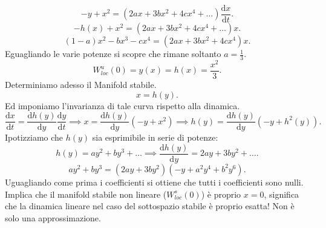 \begin{exmp}[]
    \[
	-y + x^2 = (2ax + 3bx^2+ 4cx^4 + \ldots)\frac{\text{d} x}{\text{d} t}
    .\] 
    \[
	-h(x) + x^2 = (2ax + 3bx^2+ 4cx^4 + \ldots)x
    .\] 
    \[
	(1-a)x^2 - bx^3 - cx^4 = (2ax + 3bx^2+ 4cx^4 )x
    .\] 
    Eguagliando le varie potenze si scopre che rimane soltanto $a = \frac{1}{3}$.
    \[
	W_{loc}^u(0)  = y(x) = h(x) = \frac{x^2}{3}
    .\] 
    Determiniamo adesso il Manifold stabile. 
    \[
	x = h(y) 
    .\] 
    Ed imponiamo l'invarianza di tale curva rispetto alla dinamica.
    \[
	\frac{\text{d} x}{\text{d} t} = \frac{\text{d} h(y) }{\text{d} y} \frac{\text{d} y}{\text{d} t} \implies 
	x = \frac{\text{d} h(y) }{\text{d} y} (-y+ x^2) \implies 
	h(y) = \frac{\text{d} h(y) }{\text{d} y} (-y+ h^2(y) )
    .\] 
    Ipotizziamo che $h(y) $ sia esprimibile in serie di potenze:
    \[
	h(y) = ay^2 + by^3+ \ldots \implies  \frac{\text{d} h(y) }{\text{d} y} = 2ay + 3by^2 +\ldots
    .\] 
    \[
	ay^2 + by^3 = (2ay + 3by^2) (-y + a^2y^4 + b^2y^6) 
    .\] 
    Uguagliando come prima i coefficienti si ottiene che tutti i coefficienti sono nulli.\\
    Implica che il manifold stabile non lineare ($W_{loc}^{s}(0)$)  è proprio $x = 0$, significa che la dinamica lineare nel caso del sottospazio stabile è proprio esatta! Non è solo una approssimazione.
\end{exmp}
\noindent

